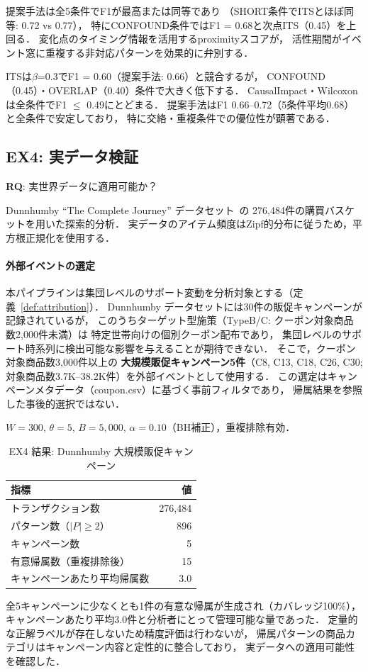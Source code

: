 提案手法は全5条件でF1が最高または同等であり
（SHORT条件でITSとほぼ同等: 0.72 vs 0.77），
特にCONFOUND条件ではF1 = 0.68と次点ITS（0.45）を上回る．
変化点のタイミング情報を活用するproximityスコアが，
活性期間がイベント窓に重複する非対応パターンを効果的に弁別する．

ITSは$\beta$=0.3でF1 = 0.60（提案手法: 0.66）と競合するが，
CONFOUND（0.45）・OVERLAP（0.40）条件で大きく低下する．
CausalImpact・Wilcoxonは全条件でF1 $\leq$ 0.49にとどまる．
提案手法はF1 0.66--0.72（5条件平均0.68）と全条件で安定しており，
特に交絡・重複条件での優位性が顕著である．

\subsection{EX4: 実データ検証}
\label{sec:exp_ex4}

\textbf{RQ}: 実世界データに適用可能か？

Dunnhumby ``The Complete Journey'' データセット~\cite{dunnhumby2014complete}の
276{,}484件の購買バスケットを用いた探索的分析．
実データのアイテム頻度はZipf的分布に従うため，平方根正規化を使用する．

\paragraph{外部イベントの選定}
本パイプラインは集団レベルのサポート変動を分析対象とする（定義~\ref{def:attribution}）．
Dunnhumby データセットには30件の販促キャンペーンが記録されているが，
このうちターゲット型施策（TypeB/C: クーポン対象商品数2{,}000件未満）は
特定世帯向けの個別クーポン配布であり，
集団レベルのサポート時系列に検出可能な影響を与えることが期待できない．
そこで，クーポン対象商品数3{,}000件以上の
\textbf{大規模販促キャンペーン5件}（C8, C13, C18, C26, C30;
対象商品数3.7K--38.2K件）を外部イベントとして使用する．
この選定はキャンペーンメタデータ（coupon.csv）に基づく事前フィルタであり，
帰属結果を参照した事後的選択ではない．

$W = 300$, $\theta = 5$, $B = 5{,}000$, $\alpha = 0.10$（BH補正），重複排除有効．

\begin{table}[t]
\caption{EX4 結果: Dunnhumby 大規模販促キャンペーン}
\label{tab:ex4_dunnhumby}
\centering
\begin{tabular}{lr}
\toprule
指標 & 値 \\
\midrule
トランザクション数 & 276{,}484 \\
パターン数（$|P| \geq 2$） & 896 \\
キャンペーン数 & 5 \\
有意帰属数（重複排除後） & 15 \\
キャンペーンあたり平均帰属数 & 3.0 \\
\bottomrule
\end{tabular}
\end{table}

全5キャンペーンに少なくとも1件の有意な帰属が生成され（カバレッジ100\%），
キャンペーンあたり平均3.0件と分析者にとって管理可能な量であった．
定量的な正解ラベルが存在しないため精度評価は行わないが，
帰属パターンの商品カテゴリはキャンペーン内容と定性的に整合しており，
実データへの適用可能性を確認した．
